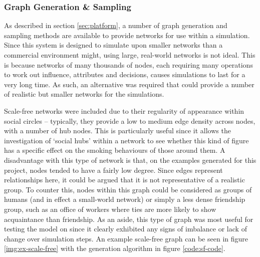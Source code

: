 \documentclass[]{report}
\begin{document}
\subsubsection{Graph Generation \& Sampling}
\label{sec:GGS}
As described in section \ref{sec:platform}, a number of graph generation and sampling methods are available to provide networks for use within a simulation. Since this system is designed to simulate upon smaller networks than a commercial environment might, using large, real-world networks is not ideal. This is because networks of many thousands of nodes, each requiring many operations to work out influence, attributes and decisions, causes simulations to last for a very long time. As such, an alternative was required that could provide a number of realistic but smaller networks for the simulations.

Scale-free networks were included due to their regularity of appearance within social circles – typically, they provide a low to medium edge density across nodes, with a number of hub nodes\cite{BA-SciAm}. This is particularly useful since it allows the investigation of `social hubs' within a network to see whether this kind of figure has a specific effect on the smoking behaviours of those around them. A disadvantage with this type of network is that, on the examples generated for this project, nodes tended to have a fairly low degree. Since edges represent relationships here, it could be argued that it is not representative of a realistic group. To counter this, nodes within this graph could be considered as groups of humans (and in effect a small-world network) or simply a less dense friendship group, such as an office of workers where ties are more likely to show acquaintance than friendship. As an aside, this type of graph was most useful for testing the model on since it clearly exhibited any signs of imbalance or lack of change over simulation steps. An example scale-free graph can be seen in figure \ref{img:ex-scale-free} with the generation algorithm in figure \ref{code:sf-code}.
\end{document}
